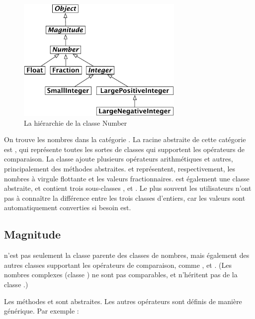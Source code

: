 \documentclass[a4paper,10pt,twoside]{book}
\begin{document}
\begin{figure}[ht]
\centerline {\includegraphics[width=8cm]{NumberHierarchy}}
\caption{La hi\'erarchie de la classe Number \label{fig:numbers}}
\end{figure}

On trouve les nombres dans la cat\'egorie . La racine abstraite de cette cat\'egorie est , qui repr\'esente toutes les sortes de classes qui supportent les op\'erateurs de comparaison. La classe  ajoute plusieurs op\'erateurs arithm\'etiques et autres, principalement des m\'ethodes abstraites.  et  repr\'esentent, respectivement, les nombres \`a virgule flottante et les valeurs fractionnaires.   est \'egalement une classe abstraite, et contient trois sous-classes ,  et . Le plus souvent les utilisateurs n'ont pas \`a conna\^itre la diff\'erence entre les trois classes d'entiers, car les valeurs sont automatiquement converties si besoin est.

\subsection{Magnitude}

 n'est pas seulement la classe parente des classes de nombres, mais \'egalement des autres classes supportant les op\'erateurs de comparaison, comme ,  et .  (Les nombres complexes (classe ) ne sont pas comparables, et n'h\'eritent pas de la classe .)

Les m\'ethodes  et  sont abstraites. Les autres op\'erateurs sont d\'efinis de mani\`ere g\'en\'erique. Par exemple :
\end{document}
